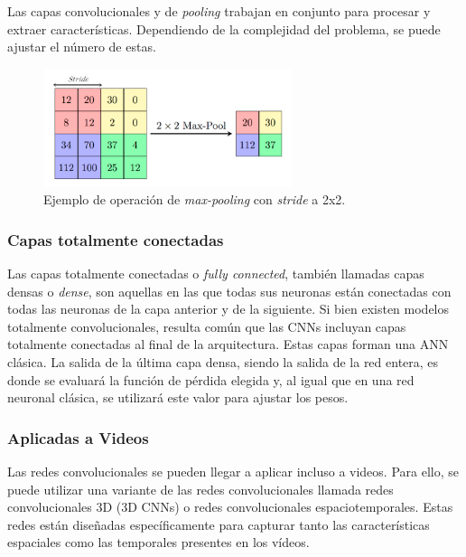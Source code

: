 Las capas convolucionales y de \emph{pooling} trabajan en conjunto para procesar y extraer 
características. 
Dependiendo de la complejidad del problema, se puede ajustar el número de estas.

\begin{figure}[htp]
  \begin{center}
    \includegraphics[width=0.65\textwidth]{imagenes/chapter2/MaxpoolSample.png}
  \end{center}

  \caption{
    Ejemplo de operación de \emph{max-pooling} con \emph{stride} a 2x2.
  }
  \label{fig:PoolingExample}
\end{figure}

\subsubsection{Capas totalmente conectadas}
Las capas totalmente conectadas o \emph{fully connected}, también llamadas 
capas densas o \emph{dense}, son aquellas en las que todas sus neuronas 
están conectadas con todas las neuronas de la capa anterior y de la
siguiente. Si bien existen modelos totalmente convolucionales, resulta común
que las CNNs incluyan capas totalmente conectadas al final de la arquitectura.
Estas capas forman una ANN clásica.
La salida de la última capa densa, siendo la salida de la red entera, es donde
se evaluará la función de pérdida elegida y, al igual que en una red neuronal
clásica, se utilizará este valor para ajustar los pesos.

\subsubsection{Aplicadas a Videos} 
\label{sec:VideoCNN}
Las redes convolucionales se pueden llegar a aplicar incluso a videos. 
Para ello, se puede utilizar una variante de las redes convolucionales llamada 
redes convolucionales 3D (3D CNNs) o redes convolucionales espaciotemporales. 
Estas redes están diseñadas específicamente para capturar tanto las características 
espaciales como las temporales presentes en los vídeos.

